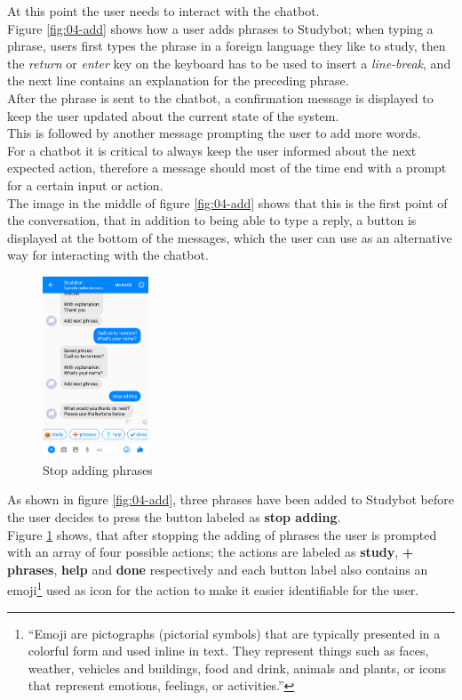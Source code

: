 At this point the user needs to interact with the chatbot.
\\
Figure \ref{fig:04-add} shows how a user adds phrases to Studybot;
when typing a phrase, users first types the phrase in a foreign language they like to study,
then the \emph{return} or \emph{enter} key on the keyboard has to be used to insert a \emph{line-break},
and the next line contains an explanation for the preceding phrase.
\\
After the phrase is sent to the chatbot,
a confirmation message is displayed to keep the user updated about the current state of the system.
\\
This is followed by another message prompting the user to add more words.
\\
For a chatbot it is critical to always keep the user informed about the next expected action,
therefore a message should most of the time end with a prompt for a certain input or action.
\\

The image in the middle of figure \ref{fig:04-add} shows that this is the first point of the conversation,
that in addition to being able to type a reply, a button is displayed at the bottom of the messages,
which the user can use as an alternative way for interacting with the chatbot.
\\

\begin{figure}
  \centering
  \includegraphics[width=0.28\textwidth]{images/interface/05-stop-adding.png}
	\caption{Stop adding phrases}
	\label{fig:05-stop-adding}
\end{figure}

As shown in figure \ref{fig:04-add}, three phrases have been added to Studybot
before the user decides to press the button labeled as \textbf{stop adding}.
\\
Figure \ref{fig:05-stop-adding} shows, that after stopping the adding of phrases the user is prompted with an array of four possible actions;
the actions are labeled as \textbf{study}, \textbf{+ phrases}, \textbf{help} and \textbf{done} respectively
and each button label also contains an emoji\footnote{``Emoji are pictographs (pictorial symbols) that are typically presented in a colorful form and used inline in text. They represent things such as faces, weather, vehicles and buildings, food and drink, animals and plants, or icons that represent emotions, feelings, or activities.''\cite{emoji}} used as icon for the action to make it easier identifiable for the user.
\\

